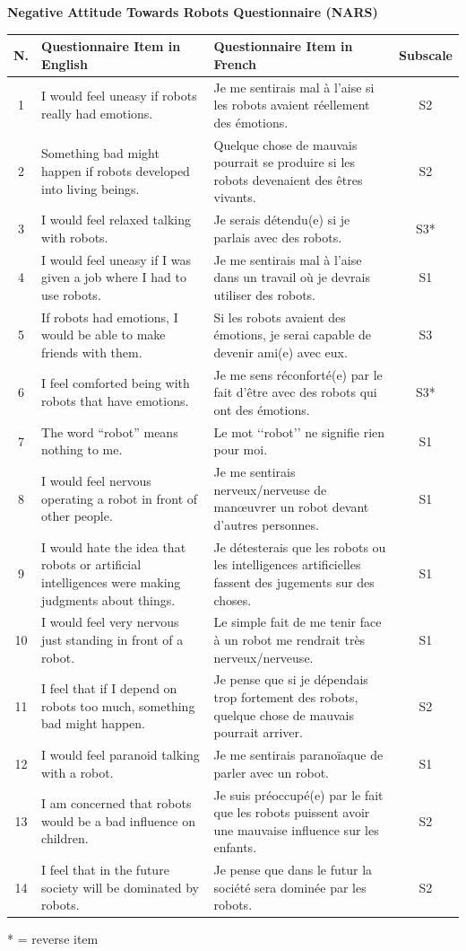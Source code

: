 \documentclass[twocolumn]{svjour3}          %
\begin{document}
\begin{table}
\textbf{Negative Attitude Towards Robots Questionnaire (NARS)}

\begin{tabular}{|c|p{7cm}|p{7cm}|c|}
\hline
N. & Questionnaire Item in English & Questionnaire Item in French & Subscale \\
 \hline
 \hline
1& I would feel uneasy if robots really had emotions. & Je me sentirais mal à l'aise si les robots avaient réellement des émotions. & S2 \\
2& Something bad might happen if robots developed into living
beings. & Quelque chose de mauvais pourrait se produire si les robots devenaient des êtres vivants. & S2 \\ 
3& I would feel relaxed talking with robots. & Je serais détendu(e) si je parlais avec des robots. & S3* \\
4& I would feel uneasy if I was given a job where I had to use robots. & Je me sentirais mal à l'aise dans un travail où je devrais utiliser des robots. & S1 \\
5& If robots had emotions, I would be able to make friends with them. & Si les robots avaient des émotions, je serai capable de devenir ami(e) avec eux. & S3 \\
6& I feel comforted being with robots that have emotions. & Je me sens réconforté(e) par le fait d’être avec des robots qui ont des émotions. & S3* \\
7& The word “robot” means nothing to me. & Le mot ‘‘robot’’ ne signifie rien pour moi. & S1 \\
8& I would feel nervous operating a robot in front of other people. & Je me sentirais nerveux/nerveuse de manœuvrer un robot devant d'autres personnes. & S1 \\
9& I would hate the idea that robots or artificial intelligences were
making judgments about things. & Je détesterais que les robots ou les intelligences artificielles fassent des jugements sur des choses. & S1 \\
10& I would feel very nervous just standing in front of a robot. & Le simple fait de me tenir face à un robot me rendrait très nerveux/nerveuse. & S1 \\
11& I feel that if I depend on robots too much, something bad might
happen. & Je pense que si je dépendais trop fortement des robots, quelque chose de mauvais pourrait arriver. & S2 \\
12& I would feel paranoid talking with a robot. & Je me sentirais paranoïaque de parler avec un robot. & S1 \\
13& I am concerned that robots would be a bad influence on children. & Je suis préoccupé(e) par le fait que les robots puissent avoir une mauvaise influence sur les enfants. & S2 \\
14& I feel that in the future society will be dominated by robots. & Je pense que dans le futur la société sera dominée par les robots. & S2 \\
\hline
\end{tabular}
* = reverse item


\end{table}
\end{document}
